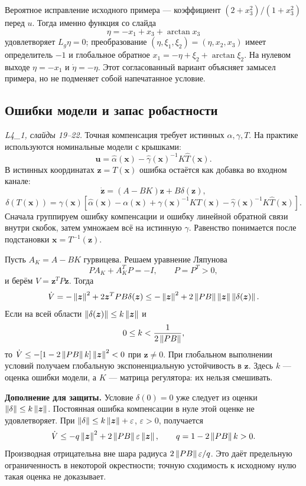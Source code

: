 Вероятное исправление исходного примера --- коэффициент
$(2+x_3^2)/(1+x_3^2)$ перед $u$. Тогда именно функция со слайда
\[
 \eta=-x_1+x_3+\arctan x_3
\]
удовлетворяет $L_g\eta=0$; преобразование
$(\eta,\xi_1,\xi_2)=(\eta,x_2,x_3)$ имеет определитель $-1$
и глобальное обратное $x_1=-\eta+\xi_2+\arctan\xi_2$.
На нулевом выходе $\eta=-x_1$ и $\dot\eta=-\eta$.
Этот согласованный вариант объясняет замысел примера, но не
подменяет собой напечатанное условие.

\subsection{Ошибки модели и запас робастности}

\textit{L4\_1, слайды 19--22.}
Точная компенсация требует истинных $\alpha,\gamma,T$.
На практике используются номинальные модели с крышками:
\[
 \bm u=\widehat\alpha(\bm x)
       -\widehat\gamma(\bm x)^{-1}K\widehat T(\bm x).
\]
В истинных координатах $\bm z=T(\bm x)$ ошибка остаётся как
добавка во входном канале:
\[
 \dot{\bm z}=(A-BK)\bm z+B\delta(\bm z),
\]
\[
 \delta(T(\bm x))=\gamma(\bm x)
 \left[\widehat\alpha(\bm x)-\alpha(\bm x)
 +\gamma(\bm x)^{-1}KT(\bm x)
 -\widehat\gamma(\bm x)^{-1}K\widehat T(\bm x)\right].
\]
Сначала группируем ошибку компенсации и ошибку линейной обратной
связи внутри скобок, затем умножаем всё на истинную $\gamma$.
Равенство понимается после подстановки $\bm x=T^{-1}(\bm z)$.

Пусть $A_K=A-BK$ гурвицева. Решаем уравнение Ляпунова
\[
 PA_K+A_K^TP=-I,\qquad P=P^T>0,
\]
и берём $V=\bm z^TP\bm z$. Тогда
\[
 \dot V=-\left\lVert\bm z\right\rVert^2+2\bm z^TPB\delta(\bm z)
 \le-\left\lVert\bm z\right\rVert^2+2\left\lVert PB\right\rVert\left\lVert\bm z\right\rVert\left\lVert\delta(\bm z)\right\rVert.
\]
Если на всей области $\left\lVert\delta(\bm z)\right\rVert\le k\left\lVert\bm z\right\rVert$ и
\[
 0\le k<\frac{1}{2\left\lVert PB\right\rVert},
\]
то $\dot V\le-[1-2\left\lVert PB\right\rVert k]\left\lVert\bm z\right\rVert^2<0$ при
$\bm z\ne0$. При глобальном выполнении условий получаем глобальную
экспоненциальную устойчивость в $\bm z$. Здесь $k$ --- оценка ошибки
модели, а $K$ --- матрица регулятора: их нельзя смешивать.

\textbf{Дополнение для защиты.} Условие $\delta(0)=0$ уже следует из
оценки $\left\lVert\delta\right\rVert\le k\left\lVert\bm z\right\rVert$. Постоянная ошибка компенсации
в нуле этой оценке не удовлетворяет. При
$\left\lVert\delta\right\rVert\le k\left\lVert\bm z\right\rVert+\varepsilon$, $\varepsilon>0$,
получается
\[
 \dot V\le-q\left\lVert\bm z\right\rVert^2+2\left\lVert PB\right\rVert\varepsilon\left\lVert\bm z\right\rVert,
 \qquad q=1-2\left\lVert PB\right\rVert k>0.
\]
Производная отрицательна вне шара радиуса
$2\left\lVert PB\right\rVert\varepsilon/q$. Это даёт предельную ограниченность
в некоторой окрестности; точную сходимость к исходному нулю
такая оценка не доказывает.

